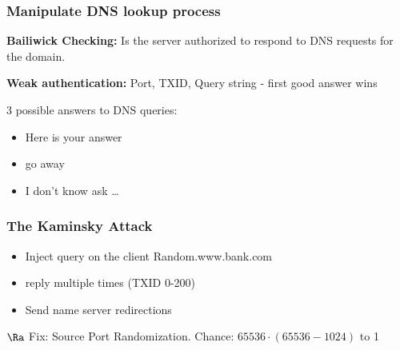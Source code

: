 \documentclass[fs, footer]{latex4ei}
\begin{document}
\begin{multicols*}{4}
{\subsubsection{Manipulate DNS lookup process}

\textbf{Bailiwick Checking:} Is the server authorized to respond to DNS requests for the domain.

\textbf{Weak authentication:} Port, TXID, Query string - first good answer wins

3 possible answers to DNS queries:
\begin{itemize}
   	\item Here is your answer
   	\item go away
   	\item I don't know ask \ldots
\end{itemize}


\subsubsection{The Kaminsky Attack}
\begin{itemize}
	\item Inject query on the client Random.www.bank.com
	\item reply multiple times  (TXID 0-200)
	\item Send name server redirections
\end{itemize}
$\Ra$ Fix: Source Port Randomization. Chance: $65536 \cdot (65536 - 1024)$ to 1
}



\end{multicols*}
\end{document}
